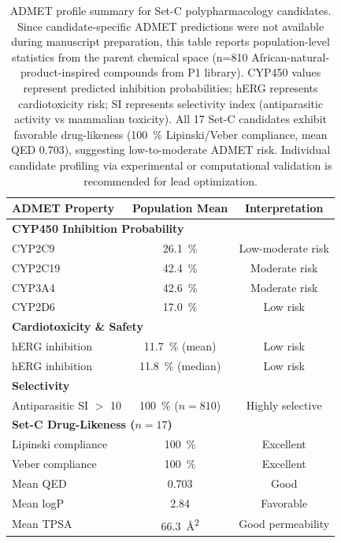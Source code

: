 \begin{table}[h!]
\centering
\caption{ADMET profile summary for Set-C polypharmacology candidates. Since candidate-specific ADMET predictions were not available during manuscript preparation, this table reports population-level statistics from the parent chemical space (n=\num{810} African-natural-product-inspired compounds from P1 library). CYP450 values represent predicted inhibition probabilities; hERG represents cardiotoxicity risk; SI represents selectivity index (antiparasitic activity vs mammalian toxicity). All \num{17} Set-C candidates exhibit favorable drug-likeness (\qty{100}{\percent} Lipinski/Veber compliance, mean QED \num{0.703}), suggesting low-to-moderate ADMET risk. Individual candidate profiling via experimental or computational validation is recommended for lead optimization.}
\label{tab:admet}
\small
\begin{tabular}{lcc}
\toprule
ADMET Property & Population Mean & Interpretation \\
\midrule
\multicolumn{3}{l}{\textbf{CYP450 Inhibition Probability}} \\
CYP2C9 & \qty{26.1}{\percent} & Low-moderate risk \\
CYP2C19 & \qty{42.4}{\percent} & Moderate risk \\
CYP3A4 & \qty{42.6}{\percent} & Moderate risk \\
CYP2D6 & \qty{17.0}{\percent} & Low risk \\
\midrule
\multicolumn{3}{l}{\textbf{Cardiotoxicity \& Safety}} \\
hERG inhibition & \qty{11.7}{\percent} (mean) & Low risk \\
hERG inhibition & \qty{11.8}{\percent} (median) & Low risk \\
\midrule
\multicolumn{3}{l}{\textbf{Selectivity}} \\
Antiparasitic SI $>$ \num{10} & \qty{100}{\percent} (\(n=\num{810}\)) & Highly selective \\
\midrule
\multicolumn{3}{l}{\textbf{Set-C Drug-Likeness (\(n=\num{17}\))}} \\
Lipinski compliance & \qty{100}{\percent} & Excellent \\
Veber compliance & \qty{100}{\percent} & Excellent \\
Mean QED & \num{0.703} & Good \\
Mean logP & \num{2.84} & Favorable \\
Mean TPSA & \qty{66.3}{\angstrom\squared} & Good permeability \\
\bottomrule
\end{tabular}
\end{table}